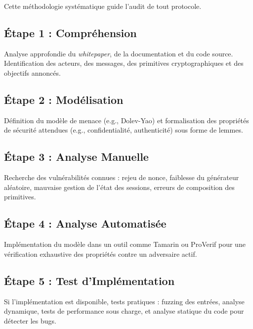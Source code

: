 Cette méthodologie systématique guide l'audit de tout protocole.

\subsection{Étape 1 : Compréhension}
\label{subsec:18.3.1}
Analyse approfondie du \textit{whitepaper}, de la documentation et du code source. Identification des acteurs, des messages, des primitives cryptographiques et des objectifs annoncés.

\subsection{Étape 2 : Modélisation}
\label{subsec:18.3.2}
Définition du modèle de menace (e.g., Dolev-Yao) et formalisation des propriétés de sécurité attendues (e.g., confidentialité, authenticité) sous forme de lemmes.

\subsection{Étape 3 : Analyse Manuelle}
\label{subsec:18.3.3}
Recherche des vulnérabilités connues : rejeu de nonce, faiblesse du générateur aléatoire, mauvaise gestion de l'état des sessions, erreurs de composition des primitives.

\subsection{Étape 4 : Analyse Automatisée}
\label{subsec:18.3.4}
Implémentation du modèle dans un outil comme Tamarin ou ProVerif pour une vérification exhaustive des propriétés contre un adversaire actif.

\subsection{Étape 5 : Test d'Implémentation}
\label{subsec:18.3.5}
Si l'implémentation est disponible, tests pratiques : fuzzing des entrées, analyse dynamique, tests de performance sous charge, et analyse statique du code pour détecter les bugs.